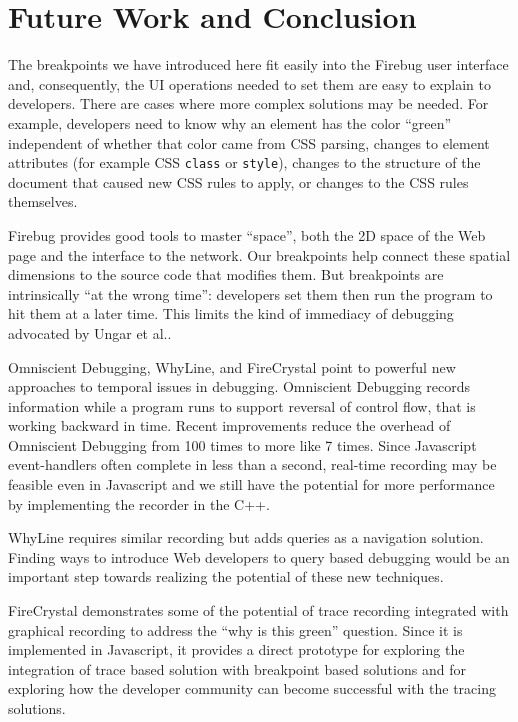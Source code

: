 \documentclass{www2010-accepted}
\begin{document}
\section{Future Work and Conclusion}
The breakpoints we have introduced here fit easily into the Firebug
user interface and, consequently, the UI operations needed to set them
are easy to explain to developers.  There are cases where more complex
solutions may be needed.
For example, developers need to know why
an element has the color ``green'' independent of whether that color came
from CSS parsing, changes to element attributes (for example CSS
\texttt{class} or \texttt{style}), changes to the structure of the
document that caused new CSS rules to apply, or changes to the CSS
rules themselves.

Firebug provides good tools to master ``space'', both the 2D space of
the Web page and the interface to the network. Our breakpoints help
connect these spatial dimensions to the source code that modifies
them. But breakpoints are intrinsically ``at the wrong time'':
developers set them then run the program to hit them at a later
time. This limits the kind of immediacy of debugging advocated by
Ungar et al.\cite{Unger97Immediacy}.

Omniscient Debugging\cite{Lewis2003Omniscient}, WhyLine\cite{Ko2008WhyLine}, and
FireCrystal\cite{Oney2009Firecrystal} point to powerful new approaches to temporal
issues in debugging.  Omniscient Debugging records information while a
program runs to support reversal of control flow, that is working
backward in time.  Recent improvements reduce the overhead of
Omniscient Debugging from 100 times to more like 7
times\cite{Lienhard08OOBack}.  Since Javascript
event-handlers often complete in less than a second, real-time
recording may be feasible even in Javascript and we still have the
potential for more performance by implementing the recorder in the
C++.

WhyLine requires similar recording but adds queries as a navigation
solution. Finding ways to introduce Web developers to query based
debugging would be an important step towards realizing the potential
of these new techniques.

FireCrystal demonstrates some of the potential of trace recording
integrated with graphical recording to address the ``why is this
green'' question.  Since it is implemented in Javascript, it provides
a direct prototype for exploring the integration of trace based
solution with breakpoint based solutions and for exploring how the
developer community can become successful with the tracing solutions.
\end{document}
